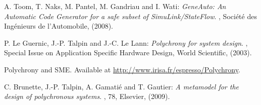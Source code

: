 \documentclass[copyright,creativecommons]{eptcs}
\renewcommand{\:}{{:}}
\begin{document}
 

{\small
\begin{thebibliography}{1}

 A. Toom, T. Naks, M. Pantel, M. Gandriau and I. Wati: 
\newblock \emph{GeneAuto: An Automatic Code Generator for a safe subset of 
SimuLink/StateFlow}.
,
Soci\'et\'e des Ing\'enieurs de l'Automobile, (2008).

 P. Le Guernic, J.-P. Talpin and J.-C. Le Lann:
\newblock \emph{Polychrony for system design}.
,
Special Issue on Application Specific Hardware Design,
World Scientific, (2003). 

 Polychrony and SME. 
\newblock Available at \url{http://www.irisa.fr/espresso/Polychrony}. 

 C. Brunette, J.-P. Talpin, A. Gamati\'e and T. Gautier:
\newblock \emph{A metamodel for the design of polychronous systems}.
, 78,
Elsevier, (2009). 

\end{thebibliography}
}
\end{document}
